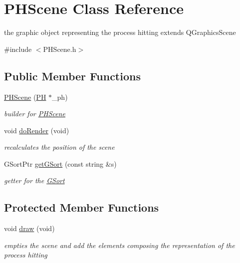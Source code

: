 \hypertarget{class_p_h_scene}{\section{\-P\-H\-Scene \-Class \-Reference}
\label{class_p_h_scene}
}


the graphic object representing the process hitting extends \-Q\-Graphics\-Scene  




{\ttfamily \#include $<$\-P\-H\-Scene.\-h$>$}

\subsection*{\-Public \-Member \-Functions}
\begin{DoxyCompactItemize}
\item 
\hypertarget{class_p_h_scene_ab911261388ccc14254980b5d01909d61}{\hyperlink{class_p_h_scene_ab911261388ccc14254980b5d01909d61}{\-P\-H\-Scene} (\hyperlink{class_p_h}{\-P\-H} $\ast$\-\_\-ph)}\label{class_p_h_scene_ab911261388ccc14254980b5d01909d61}

\begin{DoxyCompactList}\small\item\em builder for \hyperlink{class_p_h_scene}{\-P\-H\-Scene} \end{DoxyCompactList}\item 
\hypertarget{class_p_h_scene_a2f9dbd3f096e6cfcd9e924617bcc7d98}{void \hyperlink{class_p_h_scene_a2f9dbd3f096e6cfcd9e924617bcc7d98}{do\-Render} (void)}\label{class_p_h_scene_a2f9dbd3f096e6cfcd9e924617bcc7d98}

\begin{DoxyCompactList}\small\item\em recalculates the position of the scene \end{DoxyCompactList}\item 
\-G\-Sort\-Ptr \hyperlink{class_p_h_scene_ae8be020b063c06f135d644937d65147b}{get\-G\-Sort} (const string \&s)
\begin{DoxyCompactList}\small\item\em getter for the \hyperlink{class_g_sort}{\-G\-Sort} \end{DoxyCompactList}\end{DoxyCompactItemize}
\subsection*{\-Protected \-Member \-Functions}
\begin{DoxyCompactItemize}
\item 
\hypertarget{class_p_h_scene_ad4a998d52e4b2422101a63ba05a24092}{void \hyperlink{class_p_h_scene_ad4a998d52e4b2422101a63ba05a24092}{draw} (void)}\label{class_p_h_scene_ad4a998d52e4b2422101a63ba05a24092}

\begin{DoxyCompactList}\small\item\em empties the scene and add the elements composing the representation of the process hitting \end{DoxyCompactList}\end{DoxyCompactItemize}
